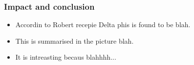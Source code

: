 \subsubsection{Impact and conclusion}

\begin{itemize}
\item Accordin to Robert recepie Delta phis is found to be blah.
\item This is summarised in the picture blah.
\item It is intreasting becaus blahhhh...
\end{itemize}
